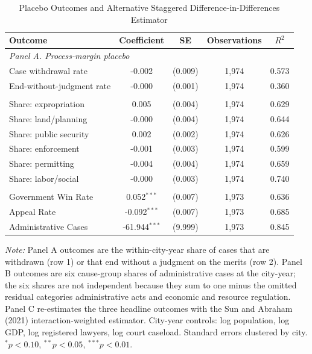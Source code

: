 \begin{table}[!htbp]
\setlength{\abovecaptionskip}{0pt}
\centering
\caption{Placebo Outcomes and Alternative Staggered Difference-in-Differences Estimator}
\label{tab:admin_placebo_alternative_appendix}
\begin{threeparttable}
\begin{tabular}{lcccc}
\toprule
Outcome & Coefficient & SE & Observations & $R^2$ \\
\midrule
\multicolumn{5}{l}{\textit{Panel A. Process-margin placebo}} \\
Case withdrawal rate & -0.002 & (0.009) & 1,974 & 0.573 \\
End-without-judgment rate & -0.000 & (0.001) & 1,974 & 0.360 \\
\addlinespace
\multicolumn{5}{l}{\textit{Panel B. Cause-mix stability placebo}} \\
Share: expropriation & 0.005 & (0.004) & 1,974 & 0.629 \\
Share: land/planning & -0.000 & (0.004) & 1,974 & 0.644 \\
Share: public security & 0.002 & (0.002) & 1,974 & 0.626 \\
Share: enforcement & -0.001 & (0.003) & 1,974 & 0.599 \\
Share: permitting & -0.004 & (0.004) & 1,974 & 0.659 \\
Share: labor/social & -0.000 & (0.003) & 1,974 & 0.740 \\
\addlinespace
\multicolumn{5}{l}{\textit{Panel C. Sun and Abraham (2021) interaction-weighted ATT}} \\
Government Win Rate & 0.052$^{***}$ & (0.007) & 1,973 & 0.636 \\
Appeal Rate & -0.092$^{***}$ & (0.007) & 1,973 & 0.685 \\
Administrative Cases & -61.944$^{***}$ & (9.999) & 1,973 & 0.845 \\
\bottomrule
\end{tabular}
\begin{tablenotes}[flushleft]
\footnotesize
\item \textit{Note:} Panel A outcomes are the within-city-year share of cases that are withdrawn (row 1) or that end without a judgment on the merits (row 2). Panel B outcomes are six cause-group shares of administrative cases at the city-year; the six shares are not independent because they sum to one minus the omitted residual categories administrative acts and economic and resource regulation. Panel C re-estimates the three headline outcomes with the Sun and Abraham (2021) interaction-weighted estimator. City-year controls: log population, log GDP, log registered lawyers, log court caseload. Standard errors clustered by city. $^{*}p<0.10$, $^{**}p<0.05$, $^{***}p<0.01$.
\end{tablenotes}
\end{threeparttable}
\end{table}
